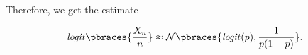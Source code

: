 \begin{solution}
\begin{enumerate}[label = (\alph*)]
\begin{enumerate}[label = \arabic*.]
        Therefore, we get the estimate

        \begin{align*}
            \mathit{logit} \pbraces{\frac{X_n}{n}}
            \approx
            \mathcal N \pbraces{\mathit{logit}(p), \frac{1}{p (1 - p)}}.
        \end{align*}

    \end{enumerate}

\end{enumerate}

\end{solution}

